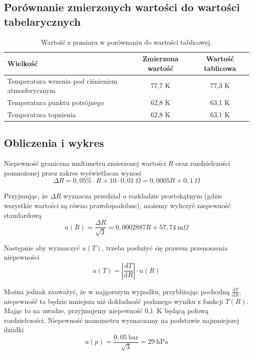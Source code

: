 \documentclass{fizykalab}
\begin{document}
\subsection{Porównanie zmierzonych wartości do wartości tabelarycznych}

\begin{table}[h]
\centering
\caption{Wartość z pomiaru w porównaniu do wartości tablicowej.}
\label{tab:comparison}

\begin{tabular}{lcc}
\toprule
\textbf{Wielkość} & \textbf{Zmierzona wartość} & \textbf{Wartość tablicowa} \\
\midrule
Temperatura wrzenia pod ciśnieniem atmosferycznym & 77,7 K & 77,3 K \\
Temperatura punktu potrójnego & 62,8 K & 63,1 K \\
Temperatura topnienia & 62,8 K & 63,1 K \\
\bottomrule
\end{tabular}

\end{table}

\subsection{Obliczenia i wykres}

Niepewność graniczna multimetru zmierzonej wartości $R$ oraz rozdzielczości pomnożonej przez zakres wyświetlacza wynosi
\begin{equation}
\Delta R = 0,05\% \cdot R + 10 \cdot 0,01~\Omega = 0,0005 R + 0,1~\Omega
\end{equation}

Przyjmując, że $\Delta R$ wyznacza przedział o rozkładzie prostokątnym (gdzie wszystkie wartości są równo prawdopodobne), możemy wyliczyć niepewność standardową
\begin{equation}
u(R) = \frac{\Delta R}{\sqrt{3}} = 0,0002887 R + 57,74~\text{m}\Omega
\end{equation}

Następnie aby wyznaczyć $u(T)$, trzeba posłużyć się prawem przenoszenia niepewności
\begin{equation}
u(T) = \left| \frac{\mathrm{d}T}{\mathrm{d}R} \right| \cdot u(R)
\end{equation}

Można jednak zauważyć, że w najgorszym wypadku, przybliżając pochodną $\frac{\mathrm{d}T}{\mathrm{d}R}$, niepewność ta będzie mniejsza niż dokładność podanego wyniku z funkcji $T(R)$. Mając to na uwadze, przyjmujemy niepewność 0,1~K będącą połową rozdzielczości.
Niepewność manometru wyznaczamy na podstawie najmniejszej działki
\begin{equation}
u(p) = \frac{0,05~\text{bar}}{\sqrt{3}} = 29~\text{hPa}
\end{equation}
\end{document}
